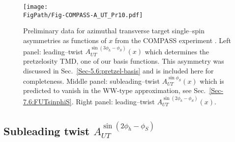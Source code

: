 \documentclass[a4paper,11pt]{article}
\newcommand*{\FigPath}{./figs}%
\begin{document}
\begin{figure}[b]
\centering
\texttt{[image: \\FigPath/Fig-COMPASS-A\_UT\_Pr10.pdf]}

\vspace{-5mm}

\caption{\label{autsinphi_jlab} 
	Preliminary data for azimuthal transverse target single--spin 
	asymmetries as functions of $x$ from the COMPASS experiment 
	\cite{Parsamyan:2015dfa}.
	Left panel: 
	leading--twist $A_{UT}^{\sin(3\phi_h-\phi_S)}(x)$ which 
	determines the pretzelosity TMD, one of our basis functions. 
	This asymmetry was discussed in Sec.~\ref{Sec-5.6:pretzel-basis} 
	and is included here for completeness. 
	Middle panel: 
	subleading--twist $A_{UT}^{\sin\phi_S}(x)$ which is predicted to vanish
	in the WW-type approximation, see Sec.~\ref{Sec-7.6:FUTsinphiS}.
	Right panel: 
	leading--twist $A_{UT}^{\sin(2\phi_h-\phi_S)}(x)$.}
\end{figure}


\subsection{\boldmath Subleading twist  $A_{UT}^{\sin(2\phi_h-\phi_S)}$ }
\label{Sec-7.8:FUTsin2phi-phiS}
\end{document}
